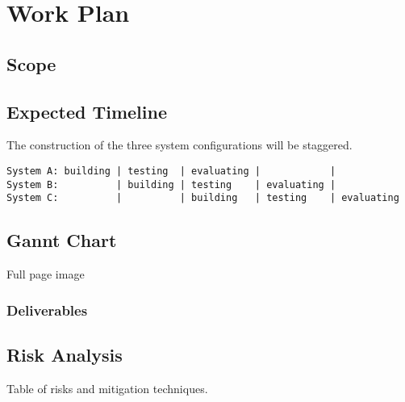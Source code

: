 
\newpage
\section{Work Plan}

\subsection{Scope}

\subsection{Expected Timeline}
The construction of the three system configurations will be staggered.
\begin{verbatim}
System A: building | testing  | evaluating |            |
System B:          | building | testing    | evaluating |
System C:          |          | building   | testing    | evaluating
\end{verbatim}


\subsection{Gannt Chart}

Full page image

\subsubsection{Deliverables}


\subsection{Risk Analysis}

Table of risks and mitigation techniques.